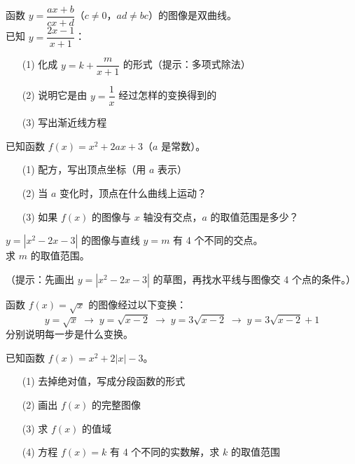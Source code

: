 
\begin{exercise}[5]
函数 \(y = \dfrac{ax + b}{cx + d}\)（\(c \neq 0\)，\(ad \neq bc\)）的图像是双曲线。\\
已知 \(y = \dfrac{2x - 1}{x + 1}\)：
\begin{enumerate}
  \item[(1)] 化成 \(y = k + \dfrac{m}{x + 1}\) 的形式（提示：多项式除法）
  \item[(2)] 说明它是由 \(y = \dfrac{1}{x}\) 经过怎样的变换得到的
  \item[(3)] 写出渐近线方程
\end{enumerate}
\end{exercise}

\begin{exercise}[5]
已知函数 \(f(x) = x^2 + 2ax + 3\)（\(a\) 是常数）。
\begin{enumerate}
  \item[(1)] 配方，写出顶点坐标（用 \(a\) 表示）
  \item[(2)] 当 \(a\) 变化时，顶点在什么曲线上运动？
  \item[(3)] 如果 \(f(x)\) 的图像与 \(x\) 轴没有交点，\(a\) 的取值范围是多少？
\end{enumerate}
\end{exercise}

\begin{exercise}[5]
\(y = |x^2 - 2x - 3|\) 的图像与直线 \(y = m\) 有 4 个不同的交点。\\
求 \(m\) 的取值范围。

（提示：先画出 \(y = |x^2 - 2x - 3|\) 的草图，再找水平线与图像交 4 个点的条件。）
\end{exercise}

\begin{exercise}[5]
函数 \(f(x) = \sqrt{x}\) 的图像经过以下变换：
\[
y = \sqrt{x} \;\to\; y = \sqrt{x - 2} \;\to\; y = 3\sqrt{x - 2} \;\to\; y = 3\sqrt{x - 2} + 1
\]
分别说明每一步是什么变换。
\end{exercise}


\begin{exercise}[6]
已知函数 \(f(x) = x^2 + 2|x| - 3\)。
\begin{enumerate}
  \item[(1)] 去掉绝对值，写成分段函数的形式
  \item[(2)] 画出 \(f(x)\) 的完整图像
  \item[(3)] 求 \(f(x)\) 的值域
  \item[(4)] 方程 \(f(x) = k\) 有 4 个不同的实数解，求 \(k\) 的取值范围
\end{enumerate}
\end{exercise}

